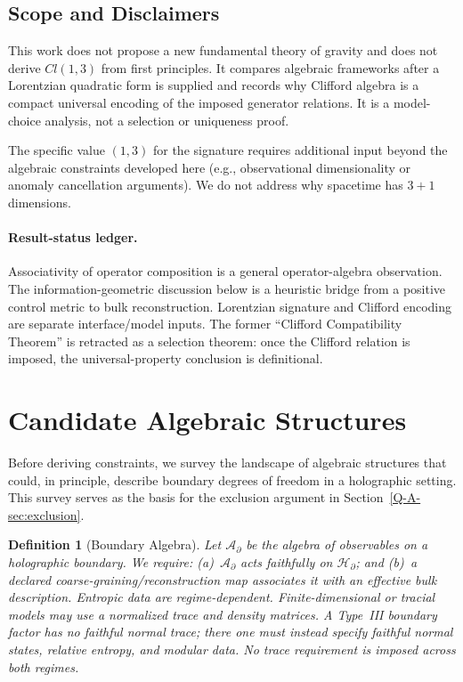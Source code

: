 \documentclass[12pt,a4paper,openany]{book}
\newtheorem{definition}[theorem]{Definition}
\begin{document}
\subsection{Scope and Disclaimers}

This work does not propose a new fundamental theory of gravity and does not derive $Cl(1,3)$ from first principles.  It compares algebraic frameworks after a Lorentzian quadratic form is supplied and records why Clifford algebra is a compact universal encoding of the imposed generator relations.  It is a model-choice analysis, not a selection or uniqueness proof.

The specific value $(1,3)$ for the signature requires additional input beyond the algebraic constraints developed here (e.g., observational dimensionality or anomaly cancellation arguments).
We do not address why spacetime has $3+1$ dimensions.

\paragraph{Result-status ledger.}
Associativity of operator composition is a general operator-algebra observation.  The information-geometric discussion below is a heuristic bridge from a positive control metric to bulk reconstruction.  Lorentzian signature and Clifford encoding are separate interface/model inputs.  The former ``Clifford Compatibility Theorem'' is retracted as a selection theorem: once the Clifford relation is imposed, the universal-property conclusion is definitional.

\section{Candidate Algebraic Structures}
\label{Q-A-sec:candidates}

Before deriving constraints, we survey the landscape of algebraic structures that could, in principle, describe boundary degrees of freedom in a holographic setting.
This survey serves as the basis for the exclusion argument in Section~\ref{Q-A-sec:exclusion}.

\begin{definition}[Boundary Algebra]
Let $\mathcal{A}_\partial$ be the algebra of observables on a holographic boundary.
We require: (a)~$\mathcal{A}_\partial$ acts faithfully on $\mathcal{H}_\partial$; and (b)~a declared coarse-graining/reconstruction map associates it with an effective bulk description.  Entropic data are regime-dependent.  Finite-dimensional or tracial models may use a normalized trace and density matrices.  A Type~III boundary factor has no faithful normal trace; there one must instead specify faithful normal states, relative entropy, and modular data.  No trace requirement is imposed across both regimes.
\end{definition}
\end{document}
